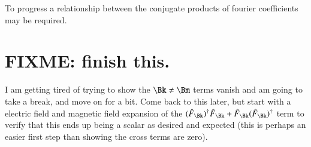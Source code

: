 \documentclass{article}
\begin{document}
To progress a relationship between the conjugate products of fourier coefficients may be required.

\section{ FIXME: finish this. }

I am getting tired of trying to show the $\Bk \ne \Bm$ terms vanish and am going to take a break, and move on for a bit.  Come back to this later, but start
with a electric field and magnetic field expansion of the $
(\hat{F}_\Bk)^\dagger \hat{F}_\Bk
+
\hat{F}_\Bk (\hat{F}_\Bk)^\dagger 
$ term to verify that this ends up being a scalar as desired and expected
(this is perhaps an easier first step than showing the cross terms are zero).



\end{document}
